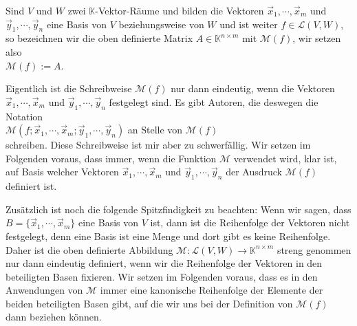 \begin{Definition}[$\mathcal{M}(f)$]
Sind $V$ und $W$ zwei $\mathbb{K}$-Vektor-R\"{a}ume und bilden die Vektoren $\vec{x}_1, \cdots, \vec{x}_m$
und $\vec{y}_1, \cdots, \vec{y}_n$ eine Basis von $V$ beziehungsweise von $W$ und ist weiter
$f \in \mathcal{L}(V, W)$, so bezeichnen wir die oben definierte Matrix $A \in \mathbb{K}^{n \times m}$ 
mit $\mathcal{M}(f)$, wir setzen also
\\[0.2cm]
\hspace*{1.3cm}
$\mathcal{M}(f) := A$. 
\eoxs
\end{Definition}

\remark
Eigentlich ist die Schreibweise $\mathcal{M}(f)$ nur dann eindeutig, wenn die Vektoren
$\vec{x}_1, \cdots, \vec{x}_m$ und $\vec{y}_1, \cdots, \vec{y}_n$ festgelegt sind.  Es
gibt Autoren, die deswegen die Notation
\\[0.2cm]
\hspace*{1.3cm}
$\mathcal{M}(f;\vec{x}_1, \cdots, \vec{x}_m; \vec{y}_1, \cdots, \vec{y}_n)$
\quad an Stelle von \quad $\mathcal{M}(f)$
\\[0.2cm]
schreiben.  Diese Schreibweise ist mir aber zu schwerf\"{a}llig.  Wir
setzen im Folgenden voraus, dass immer, wenn die Funktion $\mathcal{M}$ verwendet wird, 
klar ist, auf Basis welcher Vektoren $\vec{x}_1, \cdots, \vec{x}_m$ und $\vec{y}_1, \cdots, \vec{y}_n$  
der Ausdruck $\mathcal{M}(f)$ definiert ist.

Zus\"{a}tzlich ist noch die folgende Spitzfindigkeit zu beachten:  Wenn wir sagen, dass 
$B = \{\vec{x}_1, \cdots, \vec{x}_m \}$ eine Basis von $V$ ist, dann ist die Reihenfolge der
Vektoren nicht festgelegt, denn eine Basis ist eine Menge und dort gibt es keine
Reihenfolge.  Daher ist die oben definierte Abbildung $\mathcal{M}: \mathcal{L}(V,W) \rightarrow\mathbb{K}^{n \times m}$ 
streng genommen nur dann eindeutig definiert, wenn wir die Reihenfolge der Vektoren in den
beteiligten Basen fixieren. 
Wir setzen im Folgenden voraus, dass es in den Anwendungen von $\mathcal{M}$ immer eine kanonische
Reihenfolge der Elemente der beiden beteiligten Basen gibt, auf die wir uns bei der Definition von
$\mathcal{M}(f)$ dann beziehen k\"{o}nnen.
\eox


